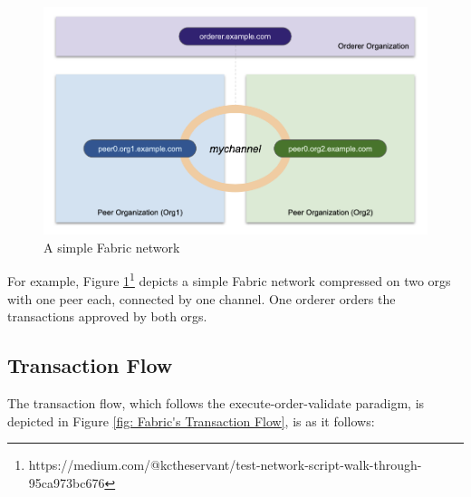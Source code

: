 \documentclass[12pt,a4paper]{article}
\theoremstyle{definition}
\begin{document}
\begin{figure}[H]

    \includegraphics[scale=0.3]{figures/channel.png}
    \centering
 \caption{A simple Fabric network}
    \label{fig:channel}
\end{figure}


For example, Figure \ref{fig:channel}\footnote{https://medium.com/@kctheservant/test-network-script-walk-through-95ca973bc676} depicts a simple Fabric network compressed on two orgs with one peer each, connected by one channel. One orderer orders the transactions approved by both orgs.



\subsection{Transaction Flow}
The transaction flow, which follows the execute-order-validate paradigm, is depicted in Figure \ref{fig: Fabric's Transaction Flow}, is as it follows:
\end{document}
